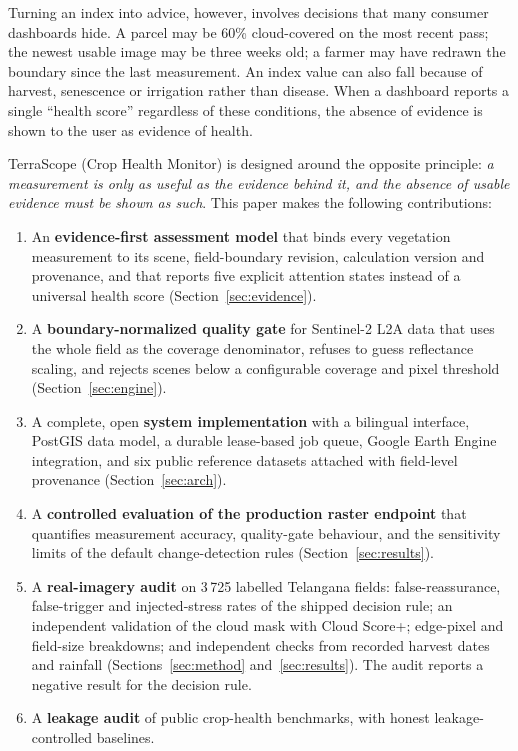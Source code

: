 \documentclass[conference]{IEEEtran}
\begin{document}
Turning an index into advice, however, involves decisions that many consumer dashboards hide. A parcel may be 60\% cloud-covered on the most recent pass; the newest usable image may be three weeks old; a farmer may have redrawn the boundary since the last measurement. An index value can also fall because of harvest, senescence or irrigation rather than disease. When a dashboard reports a single ``health score'' regardless of these conditions, the absence of evidence is shown to the user as evidence of health.

TerraScope (Crop Health Monitor) is designed around the opposite principle: \emph{a measurement is only as useful as the evidence behind it, and the absence of usable evidence must be shown as such}. This paper makes the following contributions:
\begin{enumerate}
  \item An \textbf{evidence-first assessment model} that binds every vegetation measurement to its scene, field-boundary revision, calculation version and provenance, and that reports five explicit attention states instead of a universal health score (Section~\ref{sec:evidence}).
  \item A \textbf{boundary-normalized quality gate} for Sentinel-2 L2A data that uses the whole field as the coverage denominator, refuses to guess reflectance scaling, and rejects scenes below a configurable coverage and pixel threshold (Section~\ref{sec:engine}).
  \item A complete, open \textbf{system implementation} with a bilingual interface, PostGIS data model, a durable lease-based job queue, Google Earth Engine integration, and six public reference datasets attached with field-level provenance (Section~\ref{sec:arch}).
  \item A \textbf{controlled evaluation of the production raster endpoint} that quantifies measurement accuracy, quality-gate behaviour, and the sensitivity limits of the default change-detection rules (Section~\ref{sec:results}).
  \item A \textbf{real-imagery audit} on 3\,725 labelled Telangana fields: false-reassurance, false-trigger and injected-stress rates of the shipped decision rule; an independent validation of the cloud mask with Cloud Score+; edge-pixel and field-size breakdowns; and independent checks from recorded harvest dates and rainfall (Sections~\ref{sec:method} and~\ref{sec:results}). The audit reports a negative result for the decision rule.
  \item A \textbf{leakage audit} of public crop-health benchmarks, with honest leakage-controlled baselines.
\end{enumerate}
\end{document}
